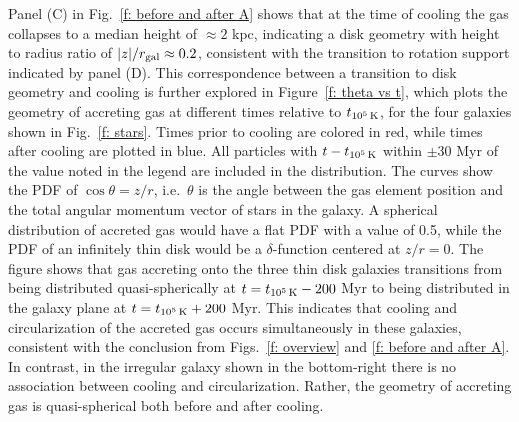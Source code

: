 \documentclass[fleqn,usenatbib]{mnras}
\newcommand{\tcon}{t_{10^5\,{\rm K}}}
\begin{document}
Panel (C) in Fig.~\ref{f: before and after A} shows that at the time of cooling the gas collapses to a median height of $\approx 2$ kpc, indicating a disk geometry with height to radius ratio of $\vert z\vert/r_{\rm gal}\approx0.2$, consistent with the transition to rotation support indicated by panel (D).
This correspondence between a transition to disk geometry and cooling is further explored in Figure~\ref{f: theta vs t}, which plots the geometry of accreting gas at different times relative to $\tcon$, for the four galaxies shown in Fig.~\ref{f: stars}. 
Times prior to cooling are colored in red, while times after cooling are plotted in blue.
All particles with $t-\tcon$ within $\pm$30 Myr of the value noted in the legend are included in the distribution. 
The curves show the PDF of $\cos \theta = z/r$, i.e.\ $\theta$ is the angle between the gas element position and the total angular momentum vector of stars in the galaxy.
A spherical distribution of accreted gas would have a flat PDF with a value of 0.5, while 
the PDF of an infinitely thin disk would be a $\delta$-function centered at $z/r = 0$.
The figure shows that gas accreting onto the three thin disk galaxies transitions from being distributed quasi-spherically at $t = \tcon-200$ Myr to being distributed in the galaxy plane at $t = \tcon+200$ Myr.
This indicates that cooling and circularization of the accreted gas occurs simultaneously in these galaxies, consistent with the conclusion from Figs.~\ref{f: overview} and \ref{f: before and after A}.
In contrast, in the irregular galaxy shown in the bottom-right there is no association between cooling and circularization.
Rather, the geometry of accreting gas is quasi-spherical both before and after cooling.

\end{document}
